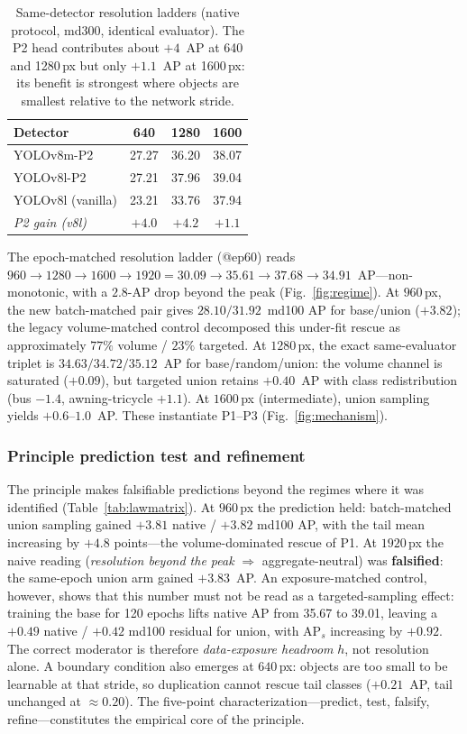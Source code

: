 \documentclass[journal]{IEEEtran}
\newcommand{\ap}{\textup{AP}}
\newcommand{\aps}{\ensuremath{\mathrm{AP}_{s}}}
\begin{document}
\begin{table}[!t]
\centering
\caption{Same-detector resolution ladders (native protocol, md300, identical evaluator). The P2 head contributes about $+4$~\ap{} at 640 and 1280\,px but only $+1.1$~\ap{} at 1600\,px: its benefit is strongest where objects are smallest relative to the network stride.}
\label{tab:ladder}
\begin{tabular}{lccc}
\toprule
Detector & 640 & 1280 & 1600 \\
\midrule
YOLOv8m-P2 & 27.27 & 36.20 & 38.07 \\
YOLOv8l-P2 & 27.21 & 37.96 & 39.04 \\
YOLOv8l (vanilla) & 23.21 & 33.76 & 37.94 \\
\midrule
\emph{P2 gain (v8l)} & \emph{$+4.0$} & \emph{$+4.2$} & \emph{$+1.1$} \\
\bottomrule
\end{tabular}
\end{table}

The epoch-matched resolution ladder (@ep60) reads $960{\to}1280{\to}1600{\to}1920 = 30.09{\to}35.61{\to}37.68{\to}34.91$~\ap{}---non-monotonic, with a $2.8$-\ap{} drop beyond the peak (Fig.~\ref{fig:regime}). At $960$\,px, the new batch-matched pair gives $28.10/31.92$~md100 \ap{} for base/union ($+3.82$); the legacy volume-matched control decomposed this under-fit rescue as approximately $77\%$ volume / $23\%$ targeted. At $1280$\,px, the exact same-evaluator triplet is $34.63/34.72/35.12$~\ap{} for base/random/union: the volume channel is saturated ($+0.09$), but targeted union retains $+0.40$~\ap{} with class redistribution (bus $-1.4$, awning-tricycle $+1.1$). At $1600$\,px (intermediate), union sampling yields $+0.6$--$1.0$~\ap. These instantiate P1--P3 (Fig.~\ref{fig:mechanism}).

\subsubsection{Principle prediction test and refinement}
\label{sec:lawtest}
The principle makes falsifiable predictions beyond the regimes where it was identified (Table~\ref{tab:lawmatrix}). At $960$\,px the prediction held: batch-matched union sampling gained $+3.81$ native / $+3.82$ md100 \ap, with the tail mean increasing by $+4.8$ points---the volume-dominated rescue of P1. At $1920$\,px the naive reading (\emph{resolution beyond the peak} $\Rightarrow$ aggregate-neutral) was \textbf{falsified}: the same-epoch union arm gained $+3.83$~\ap. An exposure-matched control, however, shows that this number must not be read as a targeted-sampling effect: training the base for 120 epochs lifts native \ap{} from 35.67 to 39.01, leaving a $+0.49$ native / $+0.42$ md100 residual for union, with \aps{} increasing by $+0.92$. The correct moderator is therefore \emph{data-exposure headroom} $h$, not resolution alone. A boundary condition also emerges at $640$\,px: objects are too small to be learnable at that stride, so duplication cannot rescue tail classes ($+0.21$~\ap, tail unchanged at $\approx0.20$). The five-point characterization---predict, test, falsify, refine---constitutes the empirical core of the principle.
\end{document}
